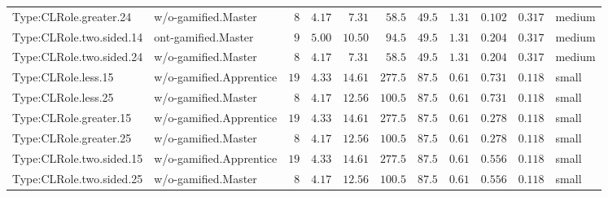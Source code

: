 \documentclass[6pt,a4paper]{article}
\begin{document}
{\begin{longtable}{llrrrrrrrrl}
Type:CLRole.greater.24&w/o-gamified.Master&$ 8$&$4.17$&$ 7.31$&$ 58.5$&$ 49.5$&$1.31$&$0.102$&$0.317$&medium\tabularnewline
Type:CLRole.two.sided.14&ont-gamified.Master&$ 9$&$5.00$&$10.50$&$ 94.5$&$ 49.5$&$1.31$&$0.204$&$0.317$&medium\tabularnewline
Type:CLRole.two.sided.24&w/o-gamified.Master&$ 8$&$4.17$&$ 7.31$&$ 58.5$&$ 49.5$&$1.31$&$0.204$&$0.317$&medium\tabularnewline
Type:CLRole.less.15&w/o-gamified.Apprentice&$19$&$4.33$&$14.61$&$277.5$&$ 87.5$&$0.61$&$0.731$&$0.118$&small\tabularnewline
Type:CLRole.less.25&w/o-gamified.Master&$ 8$&$4.17$&$12.56$&$100.5$&$ 87.5$&$0.61$&$0.731$&$0.118$&small\tabularnewline
Type:CLRole.greater.15&w/o-gamified.Apprentice&$19$&$4.33$&$14.61$&$277.5$&$ 87.5$&$0.61$&$0.278$&$0.118$&small\tabularnewline
Type:CLRole.greater.25&w/o-gamified.Master&$ 8$&$4.17$&$12.56$&$100.5$&$ 87.5$&$0.61$&$0.278$&$0.118$&small\tabularnewline
\newpage
Type:CLRole.two.sided.15&w/o-gamified.Apprentice&$19$&$4.33$&$14.61$&$277.5$&$ 87.5$&$0.61$&$0.556$&$0.118$&small\tabularnewline
Type:CLRole.two.sided.25&w/o-gamified.Master&$ 8$&$4.17$&$12.56$&$100.5$&$ 87.5$&$0.61$&$0.556$&$0.118$&small\tabularnewline
\hline
\end{longtable}}
\end{document}
